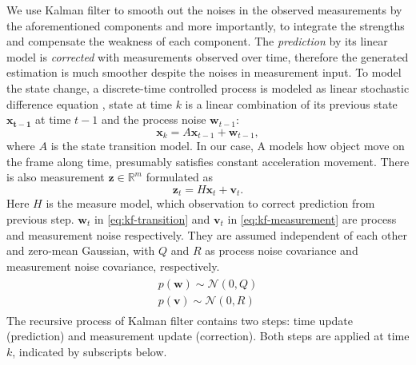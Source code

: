 We use Kalman filter to smooth out the noises in the observed measurements by the aforementioned components and more importantly, to integrate the strengths and compensate the weakness of each component. The \emph{prediction} by its linear model is \emph{corrected} with measurements observed over time, therefore the generated estimation is much smoother despite the noises in measurement input. 
To model the state change, a discrete-time controlled process is modeled as linear stochastic difference equation \cite{Welch:1995:IKF:897831}, state at time $k$ is a linear combination of its previous state $\mathbf{x_{t-1}}$ at time $t-1$
and the process noise $\mathbf{w}_{t-1}$:
\begin{equation}
  \mathbf{x}_k = A\mathbf{x}_{t-1} + \mathbf{w}_{t-1}, \label{eq:kf-transition}
\end{equation}
where $A$ is the state transition model.
In our case, A models how object move on the frame along time, presumably satisfies constant acceleration movement.
There is also measurement $\mathbf{z}\in \mathbb{R}^{m}$ formulated as
\begin{equation}
\mathbf{z}_t = H\mathbf{x}_t+\mathbf{v}_t.
\label{eq:kf-measurement}
\end{equation}
Here $H$ is the measure model, which observation to correct prediction from previous step. $\mathbf{w}_t$ in \ref{eq:kf-transition} and $\mathbf{v}_t$ in \ref{eq:kf-measurement} are process and measurement noise respectively. They are assumed independent of each other and zero-mean Gaussian, with $Q$ and $R$ as process noise covariance and measurement noise covariance, respectively.
\begin{align}
\begin{split}
p(\mathbf{w})\sim \mathcal{N}(0, Q)\\
p(\mathbf{v})\sim \mathcal{N}(0, R)
\end{split}
\end{align}
The recursive process of Kalman filter contains two steps: time update (prediction) and measurement update (correction). Both steps are applied at time $k$, indicated by subscripts below.
